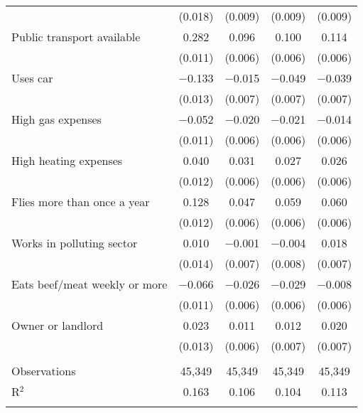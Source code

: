 \begin{tabular}{@{\extracolsep{5pt}}lcccc}
  & (0.018) & (0.009) & (0.009) & (0.009) \\ 
  Public transport available & 0.282 & 0.096 & 0.100 & 0.114 \\ 
  & (0.011) & (0.006) & (0.006) & (0.006) \\ 
  Uses car & $-$0.133 & $-$0.015 & $-$0.049 & $-$0.039 \\ 
  & (0.013) & (0.007) & (0.007) & (0.007) \\ 
  High gas expenses & $-$0.052 & $-$0.020 & $-$0.021 & $-$0.014 \\ 
  & (0.011) & (0.006) & (0.006) & (0.006) \\ 
  High heating expenses & 0.040 & 0.031 & 0.027 & 0.026 \\ 
  & (0.012) & (0.006) & (0.006) & (0.006) \\ 
  Flies more than once a year & 0.128 & 0.047 & 0.059 & 0.060 \\ 
  & (0.012) & (0.006) & (0.006) & (0.006) \\ 
  Works in polluting sector & 0.010 & $-$0.001 & $-$0.004 & 0.018 \\ 
  & (0.014) & (0.007) & (0.008) & (0.007) \\ 
  Eats beef/meat weekly or more & $-$0.066 & $-$0.026 & $-$0.029 & $-$0.008 \\ 
  & (0.011) & (0.006) & (0.006) & (0.006) \\ 
  Owner or landlord & 0.023 & 0.011 & 0.012 & 0.020 \\ 
  & (0.013) & (0.006) & (0.007) & (0.007) \\ 
 \hline \\[-1.8ex] 

Observations & 45,349 & 45,349 & 45,349 & 45,349 \\ 
R$^{2}$ & 0.163 & 0.106 & 0.104 & 0.113 \\ 
\hline 
\hline \\[-1.8ex] 
\end{tabular} 